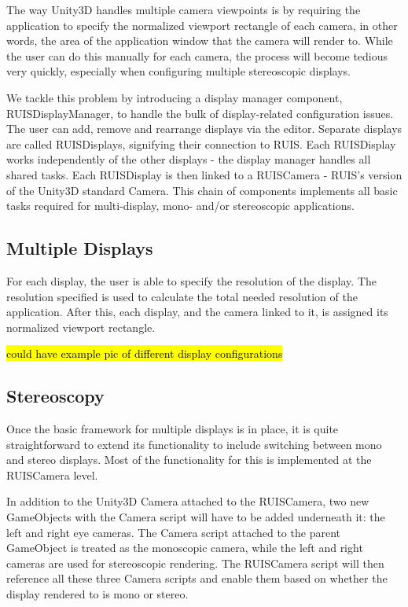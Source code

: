 \documentclass[12pt,a4paper,oneside,pdftex]{report}
\begin{document}
The way Unity3D handles multiple camera viewpoints is by requiring the application to specify the normalized viewport rectangle of each camera, in other words, the area of the application window that the camera will render to. While the user can do this manually for each camera, the process will become tedious very quickly, especially when configuring multiple stereoscopic displays. 

We tackle this problem by introducing a display manager component, RUISDisplayManager, to handle the bulk of display-related configuration issues. The user can add, remove and rearrange displays via the editor. Separate displays are called RUISDisplays, signifying their connection to RUIS. Each RUISDisplay works independently of the other displays - the display manager handles all shared tasks. Each RUISDisplay is then linked to a RUISCamera - RUIS's version of the Unity3D standard Camera. This chain of components implements all basic tasks required for multi-display, mono- and/or stereoscopic applications.

\subsection{Multiple Displays}
\label{subsection:multidisplaysystems:multipledisplays}

For each display, the user is able to specify the resolution of the display. The resolution specified is used to calculate the total needed resolution of the application. After this, each display, and the camera linked to it, is assigned its normalized viewport rectangle. 

\hl{could have example pic of different display configurations}

\subsection{Stereoscopy}
\label{subsection:multidisplaysystems:stereoscopy}

Once the basic framework for multiple displays is in place, it is quite straightforward to extend its functionality to include switching between mono and stereo displays. Most of the functionality for this is implemented at the RUISCamera level.

In addition to the Unity3D Camera attached to the RUISCamera, two new GameObjects with the Camera script will have to be added underneath it: the left and right eye cameras. The Camera script attached to the parent GameObject is treated as the monoscopic camera, while the left and right cameras are used for stereoscopic rendering. The RUISCamera script will then reference all these three Camera scripts and enable them based on whether the display rendered to is mono or stereo. 
\end{document}

